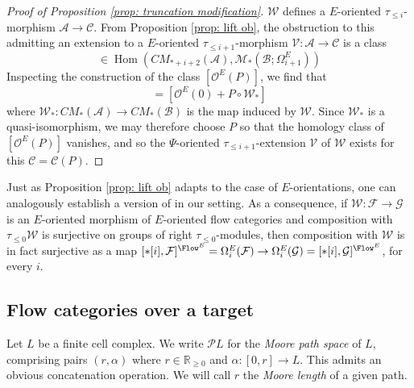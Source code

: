 \documentclass{TPmod}
\def\bR{\mathbb{R}}
\newcommand{\cA}{\mathcal{A}}
\newcommand{\cB}{\mathcal{B}}
\newcommand{\cC}{\mathcal{C}}
\newcommand{\cF}{\mathcal{F}}
\newcommand{\cG}{\mathcal{G}}
\newcommand{\cM}{\mathcal{M}}
\newcommand{\cO}{\mathcal{O}}
\newcommand{\cP}{\mathcal{P}}
\newcommand{\cV}{\mathcal{V}}
\newcommand{\cW}{\mathcal{W}}
\numberwithin{equation}{section}
\begin{document}
\begin{proof}[Proof of Proposition \ref{prop: truncation modification}]
        $\cW$ defines a $E$-oriented $\tau_{\leq i}$-morphism $\cA \to \cC$. From Proposition \ref{prop: lift ob}, the obstruction to this admitting an extension to a $E$-oriented $\tau_{\leq i+1}$-morphism $\cV: \cA \to \cC$ is a class
        \begin{equation}
            [\cO^E(P)] \in \operatorname{Hom}\left(CM_{*+i+2}(\cA), \cM_{*}(\cB; \Omega^{E}_{i+1}) \right)
        \end{equation}
        Inspecting the construction of the class $[\cO^E(P)]$, we find that
        \begin{equation}
            [\cO^E(P)] = [\cO^E(0) + P \circ \cW_*]
        \end{equation}
        where $\cW_*: CM_*(\cA) \to CM_*(\cB)$ is the map induced by $\cW$. Since $\cW_*$ is a quasi-isomorphism, we may therefore choose $P$ so that the homology class of $[\cO^E(P)]$ vanishes, and so the $\Psi$-oriented $\tau_{\leq i+1}$-extension $\cV$ of $\cW$ exists for this $\cC=\cC(P)$.
    \end{proof}

\begin{rmk}\label{rmk:truncate iso}
   Just as Proposition \ref{prop: lift ob} adapts \cite[Theorem 4.48]{PS} to the case of $E$-orientations, one can analogously establish a version of \cite[Theorem 5.51]{PS} in our setting. As a consequence, if $\cW: \cF \to \cG$ is an $E$-oriented morphism of $E$-oriented flow categories and composition with $\tau_{\leq0}\cW$ is surjective on groups of right $\tau_{\leq0}$-modules, then composition with $\cW$ is in fact surjective as a map $[\ast[i],\cF]^{\Flow^E} = \Omega^E_i(\cF) \to \Omega^E_i(\cG) = [\ast[i],\cG]^{\Flow^E}$, for every $i$. 
\end{rmk}

\subsection{Flow categories over a target\label{sec:tangerine}}



Let $L$ be a finite cell complex. We write $\cP L$ for the \emph{Moore path space} of $L$, comprising pairs $(r,\alpha)$ where $r\in \bR_{\geq 0}$ and $\alpha: [0,r] \to L$.  This admits an obvious concatenation operation. We will call $r$ the \emph{Moore length} of a given path.
\end{document}
